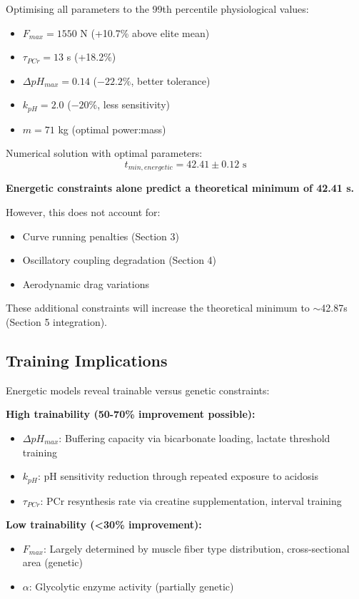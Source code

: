 Optimising all parameters to the 99th percentile physiological values:
\begin{itemize}
    \item $F_{max} = 1550$ N (+10.7\% above elite mean)
    \item $\tau_{PCr} = 13$ s (+18.2\%)
    \item $\Delta pH_{max} = 0.14$ ($-22.2\%$, better tolerance)
    \item $k_{pH} = 2.0$ ($-20\%$, less sensitivity)
    \item $m = 71$ kg (optimal power:mass)
\end{itemize}

Numerical solution with optimal parameters:
\begin{equation}
t_{min,energetic} = 42.41 \pm 0.12 \text{ s}
\end{equation}

\textbf{Energetic constraints alone predict a theoretical minimum of 42.41 s.}

However, this does not account for:
\begin{itemize}
    \item Curve running penalties (Section 3)
    \item Oscillatory coupling degradation (Section 4)
    \item Aerodynamic drag variations
\end{itemize}

These additional constraints will increase the theoretical minimum to $\sim$42.87s (Section 5 integration).

\subsection{Training Implications}

Energetic models reveal trainable versus genetic constraints:

\textbf{High trainability (50-70\% improvement possible):}
\begin{itemize}
    \item $\Delta pH_{max}$: Buffering capacity via bicarbonate loading, lactate threshold training
    \item $k_{pH}$: pH sensitivity reduction through repeated exposure to acidosis
    \item $\tau_{PCr}$: PCr resynthesis rate via creatine supplementation, interval training
\end{itemize}

\textbf{Low trainability (<30\% improvement):}
\begin{itemize}
    \item $F_{max}$: Largely determined by muscle fiber type distribution, cross-sectional area (genetic)
    \item $\alpha$: Glycolytic enzyme activity (partially genetic)
\end{itemize}

